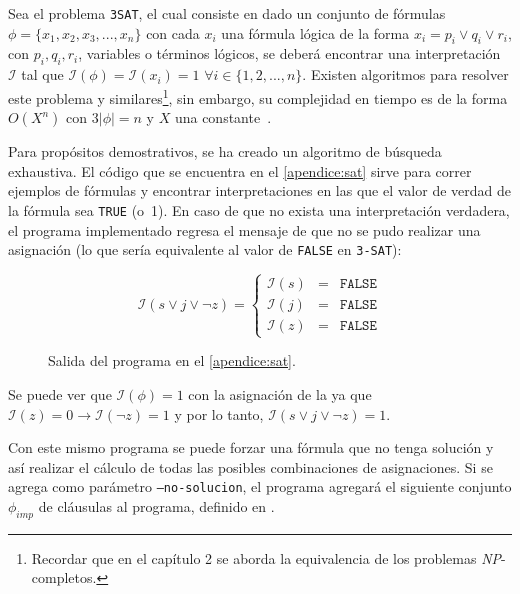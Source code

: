 Sea el problema \texttt{3SAT}, el cual consiste en dado un conjunto de fórmulas
$\phi = \{x_{1}, x_{2}, x_{3}, ..., x_{n}\}$ con cada $x_{i}$ una fórmula lógica
de la forma $x_{i} = p_{i} \lor q_{i} \lor r_{i} $, con $ p_{i}, q_{i}, r_{i}$,
variables o términos lógicos, se deberá encontrar una
interpretación $\mathcal{I}$ tal que $\mathcal{I}(\phi) = \mathcal{I}(x_{i}) = 1$
$\forall i \in \{1,2,...,n\}$. Existen algoritmos para resolver este problema
y similares\footnote{Recordar que en el capítulo 2 se aborda la equivalencia de
los problemas \textsl{NP}-completos.}, sin embargo, su complejidad en tiempo es de la
forma $O(X^{n})$ con $3|\phi| = n$ y $X$ una constante~\cite{Marques-Silva}.

Para propósitos demostrativos, se ha creado un algoritmo de búsqueda exhaustiva.
El código que se encuentra en el \cref{apendice:sat} sirve para correr
ejemplos de fórmulas y encontrar interpretaciones en las que el valor de
verdad de la fórmula sea \texttt{TRUE} (o~1). En caso de que no exista una
interpretación verdadera, el programa implementado regresa el mensaje de que no se pudo
realizar una asignación (lo que sería equivalente al valor de \texttt{FALSE} en \texttt{3-SAT}):

\begin{figure}[h]
\begin{displaymath} 
\mathcal{I}(s \lor j \lor \neg z) =\left\{
  \begin{array}{rcl}
    \mathcal{I}(s) & = & \texttt{FALSE} \\
    \mathcal{I}(j) & = & \texttt{FALSE}  \\
    \mathcal{I}(z) & = & \texttt{FALSE} 
  \end{array}
  \right.
\end{displaymath}
\caption[short caption]{Salida del programa en el \cref{apendice:sat}.}
\label{fig:salida1}
\end{figure} 

Se puede ver que $\mathcal{I}(\phi) = 1$ con la asignación de la  
ya que $\mathcal{I}(z) = 0 \rightarrow \mathcal{I}(\neg z) = 1$ y
por lo tanto, $\mathcal{I}(s \lor j \lor \neg z) = 1$.

Con este mismo programa se puede forzar una fórmula que no tenga solución y así
realizar el cálculo de todas las posibles combinaciones de asignaciones.
Si se agrega  como parámetro \texttt{--no-solucion}, el programa agregará el
siguiente conjunto $\phi_{imp}$ de cláusulas al programa, definido en .

